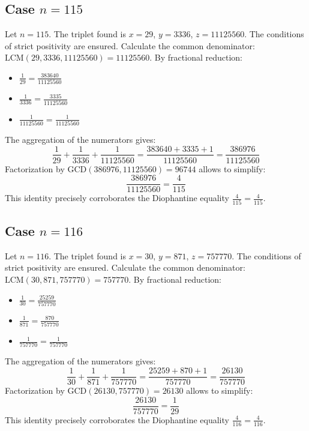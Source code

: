 \documentclass[11pt,a4paper]{article}
\begin{document}
\subsection{Case $n = 115$}
Let $n = 115$. The triplet found is $x = 29$, $y = 3336$, $z = 11125560$.
The conditions of strict positivity are ensured.
Calculate the common denominator: $\text{LCM}(29, 3336, 11125560) = 11125560$.
By fractional reduction:
\begin{itemize}
    \item $\frac{1}{29} = \frac{383640}{11125560}$
    \item $\frac{1}{3336} = \frac{3335}{11125560}$
    \item $\frac{1}{11125560} = \frac{1}{11125560}$
\end{itemize}
The aggregation of the numerators gives:
$$ \frac{1}{29} + \frac{1}{3336} + \frac{1}{11125560} = \frac{383640 + 3335 + 1}{11125560} = \frac{386976}{11125560} $$
Factorization by $\text{GCD}(386976, 11125560) = 96744$ allows to simplify:
$$ \frac{386976}{11125560} = \frac{4}{115} $$
This identity precisely corroborates the Diophantine equality $\frac{4}{115} = \frac{4}{115}$.

\subsection{Case $n = 116$}
Let $n = 116$. The triplet found is $x = 30$, $y = 871$, $z = 757770$.
The conditions of strict positivity are ensured.
Calculate the common denominator: $\text{LCM}(30, 871, 757770) = 757770$.
By fractional reduction:
\begin{itemize}
    \item $\frac{1}{30} = \frac{25259}{757770}$
    \item $\frac{1}{871} = \frac{870}{757770}$
    \item $\frac{1}{757770} = \frac{1}{757770}$
\end{itemize}
The aggregation of the numerators gives:
$$ \frac{1}{30} + \frac{1}{871} + \frac{1}{757770} = \frac{25259 + 870 + 1}{757770} = \frac{26130}{757770} $$
Factorization by $\text{GCD}(26130, 757770) = 26130$ allows to simplify:
$$ \frac{26130}{757770} = \frac{1}{29} $$
This identity precisely corroborates the Diophantine equality $\frac{4}{116} = \frac{4}{116}$.
\end{document}
